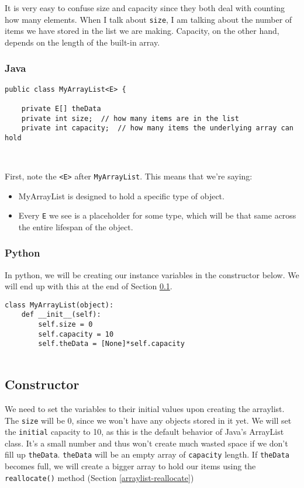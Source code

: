 It is very easy to confuse size and capacity since they both deal with counting how many elements.  When I talk about \texttt{size}, I am talking about the number of items we have stored in the list we are making.  Capacity, on the other hand, depends on the length of the built-in array. 

\subsubsection{Java}


\begin{verbatim}
public class MyArrayList<E> {
	
	private E[] theData
	private int size;  // how many items are in the list
	private int capacity;  // how many items the underlying array can hold
	
	
\end{verbatim}

First, note the \texttt{<E>} after \texttt{MyArrayList}.  This means that we're saying:
\begin{itemize}
	\item MyArrayList is designed to hold a specific type of object.
	\item Every \texttt{E} we see is a placeholder for some type, which will be that same across the entire lifespan of the object.
\end{itemize}


\subsubsection{Python}
In python, we will be creating our instance variables in the constructor below.  We will end up with this at the end of Section \ref{arraylist-constructor}.

\begin{verbatim}
class MyArrayList(object):
	def __init__(self):
		self.size = 0
		self.capacity = 10
		self.theData = [None]*self.capacity
	
\end{verbatim}


\subsection{Constructor}
\label{arraylist-constructor}

We need to set the variables to their initial values upon creating the arraylist.
The \texttt{size} will be 0, since we won't have any objects stored in it yet.
We will set the \texttt{initial} capacity to 10, as this is the default behavior of Java's ArrayList class.  
It's a small number and thus won't create much wasted space if we don't fill up \texttt{theData}.
\texttt{theData} will be an empty array of \texttt{capacity} length.
If \texttt{theData} becomes full, we will create a bigger array to hold our items using the \texttt{reallocate()} method (Section \ref{arraylist-reallocate})  %


